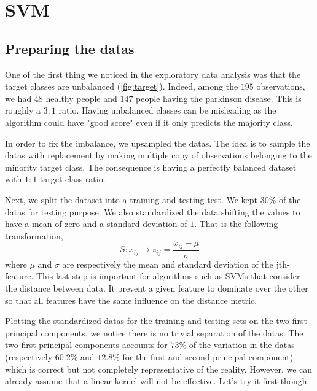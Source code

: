 \section{SVM}

\subsection[short]{Preparing the datas}

One of the first thing we noticed in the exploratory data analysis was that the target classes are unbalanced (\autoref{fig:target}). Indeed, among the $195$ observations, we had $48$ healthy people and $147$ people having the parkinson disease. This is roughly a $3:1$ ratio. Having unbalanced classes can be misleading as the algorithm could have "good score" even if it only predicts the majority class. 

In order to fix the imbalance, we upsampled the datas. The idea is to sample the datas with replacement by making multiple copy of observations belonging to the minority target class. The consequence is having a perfectly balanced dataset with $1:1$ target class ratio.

Next, we split the dataset into a training and testing test. We kept $30\%$ of the datas for testing purpose. We also standardized the data shifting the values to have a mean of zero and a standard deviation of $1$. That is the following transformation,
\begin{equation}
	S: x_{ij} \rightarrow z_{ij} = \frac{x_{ij} - \mu}{\sigma}
\end{equation}
where $\mu$ and $\sigma$ are respectively the mean and standard deviation of the jth-feature.
This last step is important for algorithms such as SVMs that consider the distance between data. It prevent a given feature to dominate over the other so that all features have the same influence on the distance metric. 

Plotting the standardized datas for the training and testing sets on the two first principal components, we notice there is no trivial separation of the datas. The two first principal components accounts for $73\%$ of the variation in the datas (respectively $60.2\%$ and $12.8\%$ for the first and second principal component) which is correct but not completely representative of the reality. However, we can already assume that a linear kernel will not be effective. Let's try it first though.

